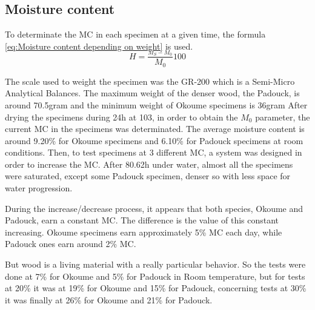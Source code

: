\documentclass[3p,times,procedia]{elsarticle}
\begin{document}
\subsection{Moisture content}\label{Ss:mm}

To determinate the MC in each specimen at a given time, the formula \ref{eq:Moisture content depending on weight} is used.  
\begin{equation}
	H=\frac{_{M_{S}-M_{0}}}{M_{0}}100
	\label{eq:Moisture content depending on weight}
\end{equation} 

The scale used to weight the specimen was the GR-200 which is a Semi-Micro Analytical Balances. The maximum weight of the denser wood, the Padouck, is around 70.5\si{gram} and the minimum weight of Okoume specimens is 36\si{gram}
After drying the specimens during 24h at 103\textcelsius, in order to obtain the $M_{0}$ parameter, the current MC in the specimens was determinated. 
The average moisture content is around 9.20\% for Okoume specimens and 6.10\% for Padouck specimens at room conditions.
Then, to test specimens at 3 different MC, a system was designed in order to increase the MC.
After 80.62h under water, almost all the specimens were saturated, except some Padouck specimen, denser so with less space for water progression.

During the increase/decrease process, it appears that both species, Okoume and Padouck, earn a constant MC. The difference is the value of this constant increasing. Okoume specimens earn approximately 5\% MC each day, while Padouck ones earn around 2\% MC.


But wood is a living material with a really particular behavior. So the tests were done at 7\% for Okoume and 5\% for Padouck in Room temperature, but for tests at 20\% it was at 19\% for Okoume and 15\% for Padouck, concerning tests at 30\% it was finally at 26\% for Okoume and 21\% for Padouck.

\end{document}
